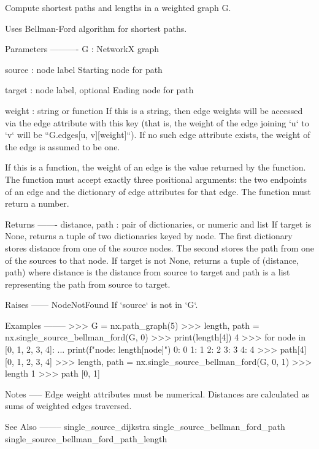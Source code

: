 \begin{DoxyVerb}Compute shortest paths and lengths in a weighted graph G.

Uses Bellman-Ford algorithm for shortest paths.

Parameters
----------
G : NetworkX graph

source : node label
    Starting node for path

target : node label, optional
    Ending node for path

weight : string or function
    If this is a string, then edge weights will be accessed via the
    edge attribute with this key (that is, the weight of the edge
    joining `u` to `v` will be ``G.edges[u, v][weight]``). If no
    such edge attribute exists, the weight of the edge is assumed to
    be one.

    If this is a function, the weight of an edge is the value
    returned by the function. The function must accept exactly three
    positional arguments: the two endpoints of an edge and the
    dictionary of edge attributes for that edge. The function must
    return a number.

Returns
-------
distance, path : pair of dictionaries, or numeric and list
    If target is None, returns a tuple of two dictionaries keyed by node.
    The first dictionary stores distance from one of the source nodes.
    The second stores the path from one of the sources to that node.
    If target is not None, returns a tuple of (distance, path) where
    distance is the distance from source to target and path is a list
    representing the path from source to target.

Raises
------
NodeNotFound
    If `source` is not in `G`.

Examples
--------
>>> G = nx.path_graph(5)
>>> length, path = nx.single_source_bellman_ford(G, 0)
>>> print(length[4])
4
>>> for node in [0, 1, 2, 3, 4]:
...     print(f"{node}: {length[node]}")
0: 0
1: 1
2: 2
3: 3
4: 4
>>> path[4]
[0, 1, 2, 3, 4]
>>> length, path = nx.single_source_bellman_ford(G, 0, 1)
>>> length
1
>>> path
[0, 1]

Notes
-----
Edge weight attributes must be numerical.
Distances are calculated as sums of weighted edges traversed.

See Also
--------
single_source_dijkstra
single_source_bellman_ford_path
single_source_bellman_ford_path_length
\end{DoxyVerb}
 \mbox{\label{namespacenetworkx_1_1algorithms_1_1shortest__paths_1_1weighted_a7193ad94b7b96b526d6f504fbd9928d3}} 
